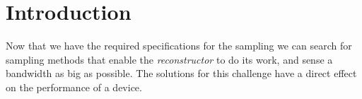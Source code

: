 \documentclass[a4paper, openany, oneside]{memoir}
\begin{document}
\section{Introduction}
Now that we have the required specifications for the sampling we can search for sampling methods that enable the \textit{reconstructor} to do its work, and sense a bandwidth as big as possible. The solutions for this challenge have a direct effect on the performance of a device.    
\end{document}
